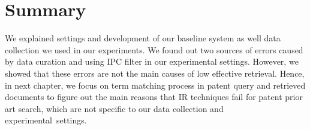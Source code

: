 \section{Summary}
\label{sce: summary3}
%
We explained settings and development of our baseline system 
as well data collection we used in our experiments. We found 
out two sources of errors caused by data curation and using 
IPC filter in our experimental settings. 
 However, we showed that these errors are not the 
main causes of low effective retrieval. Hence, in next chapter, 
we focus on term matching process in patent query and retrieved 
documents to figure out the main reasons that IR techniques fail 
for patent prior art search, which are not specific to our data 
collection and experimental~settings. 


